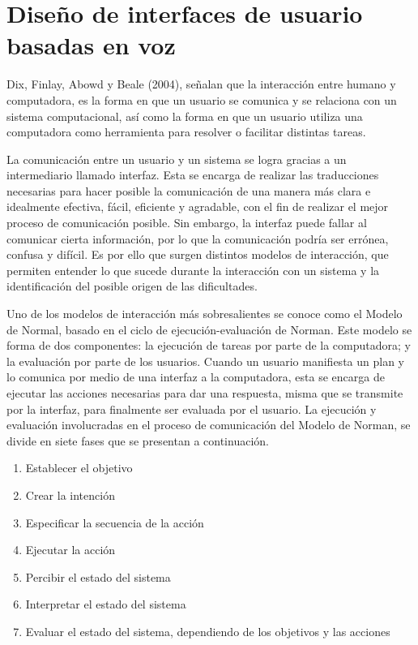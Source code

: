
\chapter{Diseño de interfaces de usuario basadas en voz}
\label{capIII}

Dix, Finlay, Abowd y Beale (2004), señalan que la interacción entre humano y computadora, es la forma en que un usuario se comunica y se relaciona con un sistema computacional, así como la forma en que un usuario utiliza una computadora como herramienta para resolver o facilitar distintas tareas.

La comunicación entre un usuario y un sistema se logra gracias a un intermediario llamado interfaz. Esta se encarga de realizar las traducciones necesarias para hacer posible la comunicación de una manera más clara e idealmente efectiva, fácil, eficiente y agradable, con el fin de realizar el mejor proceso de comunicación posible. Sin embargo, la interfaz puede fallar al comunicar cierta información, por lo que la comunicación podría ser errónea, confusa y difícil. Es por ello que surgen distintos modelos de interacción, que permiten entender lo que sucede durante la interacción con un sistema y la identificación del posible origen de las dificultades.

Uno de los modelos de interacción más sobresalientes se conoce como el Modelo de Normal, basado en el ciclo de ejecución-evaluación de Norman. Este modelo se forma de dos componentes: la ejecución de tareas por parte de la computadora; y la evaluación por parte de los usuarios. Cuando un usuario manifiesta un plan y lo comunica por medio de una interfaz a la computadora, esta se encarga de ejecutar las acciones necesarias para dar una respuesta, misma que se transmite por la interfaz, para finalmente ser evaluada por el usuario. La ejecución  y evaluación involucradas en el proceso de comunicación del Modelo de Norman, se divide en siete fases que se presentan a continuación.

\begin{enumerate}
  \item Establecer el objetivo
  \item Crear la intención
  \item Especificar la secuencia de la acción
  \item Ejecutar la acción
  \item Percibir el estado del sistema
  \item Interpretar el estado del sistema
  \item Evaluar el estado del sistema, dependiendo de los objetivos y las acciones
\end{enumerate}

